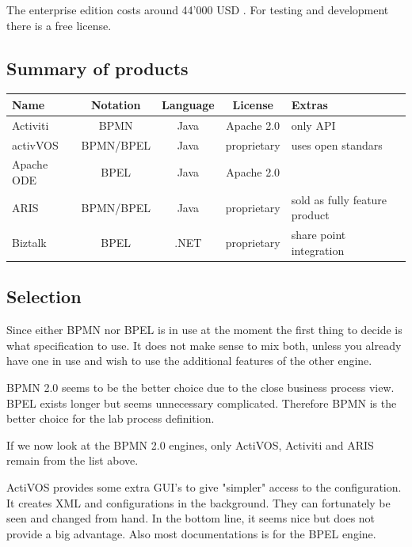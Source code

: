 \documentclass[paper=a4,twoside=false,BCOR=0mm,DIV=calc,fontsize=12pt]{scrartcl}
\begin{document}
The enterprise edition costs around 44'000 USD \cite{biztalkcost}. For testing and development there is a free license.


\subsection{Summary of products}

\begin{center}
\begin{tabular}{l | c c c p{3cm}}
\toprule

Name & Notation & Language & License & Extras \\

\midrule

Activiti & BPMN & Java & Apache 2.0 & only API \\
activVOS & BPMN/BPEL & Java & proprietary &  uses open standars \\
Apache ODE & BPEL & Java & Apache 2.0 &   \\
ARIS & BPMN/BPEL & Java & proprietary &  sold as fully feature product \\
Biztalk & BPEL & .NET & proprietary &  share point integration \\


\bottomrule
\end{tabular}

\label{tab:enginecomparison}
\end{center}

\subsection{Selection}
Since either BPMN nor BPEL is in use at the moment the first thing to decide is what specification to use.
It does not make sense to mix both, unless you already have one in use and wish to use the additional features of the other engine. 

BPMN 2.0 seems to be the better choice due to the close business process view. BPEL exists longer but seems unnecessary complicated.
Therefore BPMN is the better choice for the lab process definition. 

If we now look at the BPMN 2.0 engines, only ActiVOS, Activiti and ARIS remain from the list above.

ActiVOS provides some extra GUI's to give "simpler" access to the configuration. It creates XML and configurations in the background.
They can fortunately be seen and changed from hand. In the bottom line, it seems nice but does not provide a big advantage. Also most documentations is for the BPEL engine.
\end{document}
